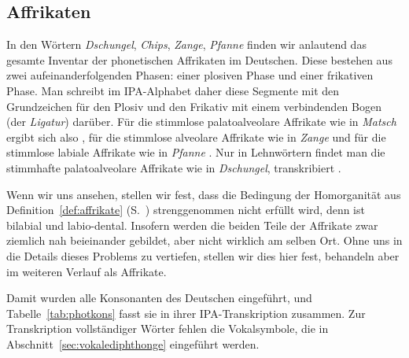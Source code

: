 \subsection{Affrikaten}

\label{sec:affrikatenartikulationsorte}


In den Wörtern \textit{Dschungel}, \textit{Chips}, \textit{Zange}, \textit{Pfanne} finden wir anlautend das gesamte Inventar der phonetischen Affrikaten im Deutschen.
Diese bestehen aus zwei aufeinanderfolgenden Phasen: einer plosiven Phase und einer frikativen Phase.
Man schreibt im IPA-Alphabet daher diese Segmente mit den Grundzeichen für den Plosiv und den Frikativ mit einem verbindenden Bogen (der \textit{Ligatur}) darüber.
Für die stimmlose palatoalveolare Affrikate wie in \textit{Matsch} ergibt sich also \textipa{[\t{tS}]}, für die stimmlose alveolare Affrikate wie in \textit{Zange} \textipa{[\t{ts}]} und für die stimmlose labiale Affrikate wie in \textit{Pfanne} \textipa{[\t{pf}]}.
Nur in Lehnwörtern findet man die stimmhafte palatoalveolare Affrikate wie in \textit{Dschungel}, transkribiert \textipa{[\t{dZ}]}.

Wenn wir uns \textipa{[\t{pf}]} ansehen, stellen wir fest, dass die Bedingung der Homorganität aus Definition~\ref{def:affrikate} (S.~\pageref{def:affrikate}) strenggenommen nicht erfüllt wird, denn \textipa{[p]} ist bilabial und \textipa{[f]} labio-dental.
Insofern werden die beiden Teile der Affrikate zwar ziemlich nah beieinander gebildet, aber nicht wirklich am selben Ort.
Ohne uns in die Details dieses Problems zu vertiefen, stellen wir dies hier fest, behandeln \textipa{[\t{pf}]} aber im weiteren Verlauf als Affrikate.

Damit wurden alle Konsonanten des Deutschen eingeführt, und Tabelle~\ref{tab:photkons} fasst sie in ihrer IPA-Transkription zusammen.
Zur Transkription vollständiger Wörter fehlen die Vokalsymbole, die in Abschnitt~\ref{sec:vokalediphthonge} eingeführt werden.

